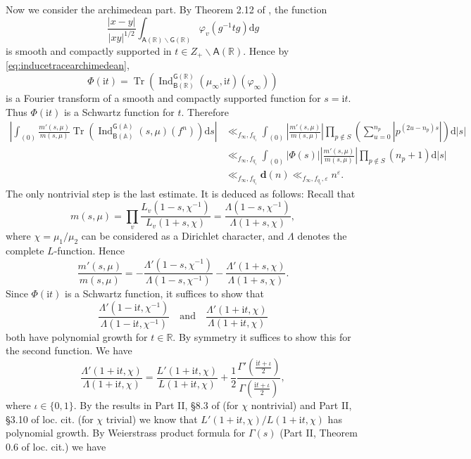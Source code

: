 \documentclass[10pt,oneside,reqno]{amsart}
\makeatletter
\let\SSec\S
\newcommand\rmd{\mathrm{d}}
\newcommand\rmi{\mathrm{i}}
\renewcommand\AA{\mathbb{A}}
\newcommand\RR{\mathbb{R}}
\newcommand\A{\mathsf{A}}
\newcommand\B{\mathsf{B}}
\newcommand\G{\mathsf{G}}
\renewcommand\S{\mathsf{S}}
\newcommand\bs{\backslash}
\DeclareMathOperator\Tr{Tr}
\DeclareMathOperator\Ind{Ind}
\theoremstyle{THEOREM}
\theoremstyle{DEFINITION}
\theoremstyle{EXERCISE}
\numberwithin{equation}{section}
\renewenvironment{proof}[1][\proofname]{\par
  \vspace{-6pt}
  \pushQED{\qed}
  \normalfont \topsep6\p@\@plus6\p@\relax
  \trivlist
  \item[\hskip\labelsep\rmfamily\bfseries
    #1\@addpunct{:}]\ignorespaces
}{
  \popQED\endtrivlist\@endpefalse
  \vspace{-6pt}
}
\makeatother
\begin{document}
\begin{proof}[Proof of \autoref{prop:continuouspart}]
Now we consider the archimedean part. By Theorem 2.12 of \cite{cheng2025}, the function
\[ 
\frac{|x-y|}{|xy|^{1/2}}\int_{\A(\RR)\bs \G(\RR)}\varphi_v(g^{-1}tg)\rmd g 
\]
is smooth and compactly supported in $t\in Z_+\bs \A(\RR)$.
Hence by \eqref{eq:inducetracearchimedean}, 
\[
\Phi(\rmi t)=\Tr\left(\Ind_{\B(\RR)}^{\G(\RR)}(\mu_\infty,\rmi t)(\varphi_\infty)\right)
\] 
is a Fourier transform %
of a smooth and compactly supported function for $s=\rmi t$. Thus $\Phi(\rmi t)$ is a Schwartz function for $t$. Therefore
\begin{equation}\label{eq:estimatects1}
\begin{split}
  \left|\int_{(0)}\frac{m'(s,\mu)}{m(s,\mu)}\Tr\left(\Ind_{\B(\AA)}^{\G(\AA)}(s,\mu)(f^n)\right)\rmd s \right|
    &\ll_{f_\infty, f_{q_i}} \int_{(0)}\left|\frac{m'(s,\mu)}{m(s,\mu)}\right|\prod_{p\notin S}\left(\sum_{u=0}^{n_p}|p^{(2u-n_p)s}|\right) \rmd |s|\\
    &\ll_{f_\infty, f_{q_i}} \int_{(0)}|\Phi(s)|\left|\frac{m'(s,\mu)}{m(s,\mu)}\right|\prod_{p\notin S}(n_p+1)\rmd |s|\\
    &\ll_{f_\infty, f_{q_i}} \bm{d}(n)\ll_{f_\infty, f_{q_i},\varepsilon} n^\varepsilon.
\end{split}
\end{equation}
The only nontrivial step is the last estimate. It is deduced as follows: Recall that
\[
m(s,\mu)=\prod_{v}\frac{L_v(1-s,\chi^{-1})}{L_v(1+s,\chi)}=\frac{\Lambda(1-s,\chi^{-1})}{\Lambda (1+s,\chi)},
\]
where $\chi=\mu_1/\mu_2$ can be considered as a Dirichlet character, and $\Lambda$ denotes the complete $L$-function. Hence
\[
\frac{m'(s,\mu)}{m(s,\mu)}=-\frac{\Lambda'(1-s,\chi^{-1})}{\Lambda(1-s,\chi^{-1})}-\frac{\Lambda' (1+s,\chi)}{\Lambda (1+s,\chi)}.
\]
Since $\Phi(\rmi t)$ is a Schwartz function, it suffices to show that 
\[
\frac{\Lambda'(1-\rmi t,\chi^{-1})}{\Lambda(1-\rmi t,\chi^{-1})}\quad\text{and}\quad
\frac{\Lambda' (1+\rmi t,\chi)}{\Lambda (1+\rmi t,\chi)}
\]
both have polynomial growth for $t\in \RR$. By symmetry it suffices to show this for the second function. We have
\[
\frac{\Lambda' (1+\rmi t,\chi)}{\Lambda (1+\rmi t,\chi)}=\frac{L' (1+\rmi t,\chi)}{L (1+\rmi t,\chi)}+\frac{1}{2}\frac{\Gamma'(\frac{\rmi t+\iota}{2})}{\Gamma(\frac{\rmi t+\iota}{2})},
\]
where $\iota\in \{0,1\}$.
By the results in Part II, \SSec 8.3 of \cite{tenenbaum2015analytic} (for $\chi$ nontrivial) and Part II, \SSec 3.10 of loc. cit. (for $\chi$ trivial) we know that $L'(1+\rmi t,\chi)/L(1+\rmi t,\chi)$ has polynomial growth. By Weierstrass product formula for $\Gamma(s)$ (Part II, Theorem 0.6 of loc. cit.) we have

\end{proof}
\end{document}
